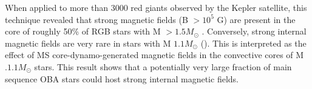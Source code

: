 When applied to more than 3000 red giants observed by the Kepler satellite, this technique revealed that
strong magnetic fields (B $> 10^5$ G) are present in the core of roughly 50\% of RGB stars with M $> 1.5M_\odot$ \citep{Stello_2016}.
Conversely, strong internal magnetic fields are very rare in stars with M $ 1.1M_\odot$ (\color). This is interpreted as the
effect of MS core-dynamo-generated magnetic fields in the convective cores of M $. 1.1M_\odot$ stars.
This result shows that a potentially very large fraction of main sequence OBA stars could host strong internal magnetic fields.



